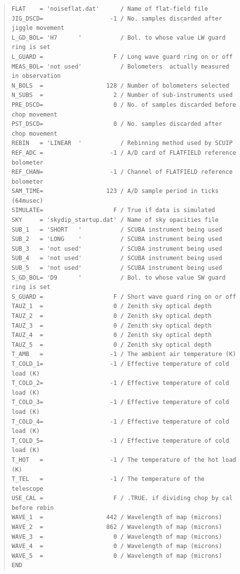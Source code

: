\documentclass[twoside,11pt]{article}
\newenvironment{myquote}{\begin{quote}\begin{small}}{\end{small}\end{quote}}
\renewcommand{\_}{\texttt{\symbol{95}}}
\begin{document}
\begin{myquote}
\begin{verbatim}
FLAT    = 'noiseflat.dat'      / Name of flat-field file
JIG_DSCD=                   -1 / No. samples discarded after jiggle movement
L_GD_BOL= 'H7      '           / Bol. to whose value LW guard ring is set
L_GUARD =                    F / Long wave guard ring on or off
MEAS_BOL= 'not used'           / Bolometers  actually measured in observation
N_BOLS  =                  128 / Number of bolometers selected
N_SUBS  =                    2 / Number of sub-instruments used
PRE_DSCD=                    0 / No. of samples discarded before chop movement
PST_DSCD=                    0 / No. samples discarded after chop movement
REBIN   = 'LINEAR  '           / Rebinning method used by SCUIP
REF_ADC =                   -1 / A/D card of FLATFIELD reference bolometer
REF_CHAN=                   -1 / Channel of FLATFIELD reference bolometer
SAM_TIME=                  123 / A/D sample period in ticks (64musec)
SIMULATE=                    F / True if data is simulated
SKY     = 'skydip_startup.dat' / Name of sky opacities file
SUB_1   = 'SHORT   '           / SCUBA instrument being used
SUB_2   = 'LONG    '           / SCUBA instrument being used
SUB_3   = 'not used'           / SCUBA instrument being used
SUB_4   = 'not used'           / SCUBA instrument being used
SUB_5   = 'not used'           / SCUBA instrument being used
S_GD_BOL= 'D9      '           / Bol. to whose value SW guard ring is set
S_GUARD =                    F / Short wave guard ring on or off
TAUZ_1  =                    0 / Zenith sky optical depth
TAUZ_2  =                    0 / Zenith sky optical depth
TAUZ_3  =                    0 / Zenith sky optical depth
TAUZ_4  =                    0 / Zenith sky optical depth
TAUZ_5  =                    0 / Zenith sky optical depth
T_AMB   =                   -1 / The ambient air temperature (K)
T_COLD_1=                   -1 / Effective temperature of cold load (K)
T_COLD_2=                   -1 / Effective temperature of cold load (K)
T_COLD_3=                   -1 / Effective temperature of cold load (K)
T_COLD_4=                   -1 / Effective temperature of cold load (K)
T_COLD_5=                   -1 / Effective temperature of cold load (K)
T_HOT   =                   -1 / The temperature of the hot load (K)
T_TEL   =                   -1 / The temperature of the telescope
USE_CAL =                    F / .TRUE. if dividing chop by cal before rebin
WAVE_1  =                  442 / Wavelength of map (microns)
WAVE_2  =                  862 / Wavelength of map (microns)
WAVE_3  =                    0 / Wavelength of map (microns)
WAVE_4  =                    0 / Wavelength of map (microns)
WAVE_5  =                    0 / Wavelength of map (microns)
END
\end{verbatim}
\end{myquote}
\end{document}
